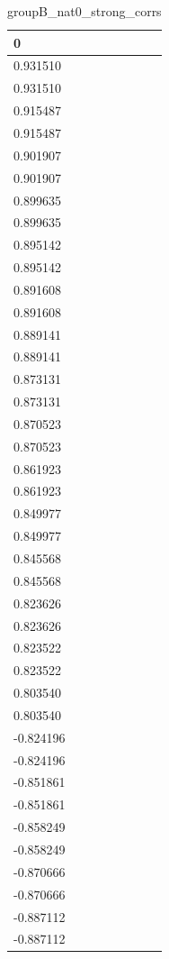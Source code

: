 \begin{table}
\caption{groupB_nat0_strong_corrs}
\label{tab:groupB_nat0_strong_corrs}
\begin{tabular}{lcr}
\toprule
0 \\
\midrule
0.931510 \\
0.931510 \\
0.915487 \\
0.915487 \\
0.901907 \\
0.901907 \\
0.899635 \\
0.899635 \\
0.895142 \\
0.895142 \\
0.891608 \\
0.891608 \\
0.889141 \\
0.889141 \\
0.873131 \\
0.873131 \\
0.870523 \\
0.870523 \\
0.861923 \\
0.861923 \\
0.849977 \\
0.849977 \\
0.845568 \\
0.845568 \\
0.823626 \\
0.823626 \\
0.823522 \\
0.823522 \\
0.803540 \\
0.803540 \\
-0.824196 \\
-0.824196 \\
-0.851861 \\
-0.851861 \\
-0.858249 \\
-0.858249 \\
-0.870666 \\
-0.870666 \\
-0.887112 \\
-0.887112 \\
\bottomrule
\end{tabular}
\end{table}
